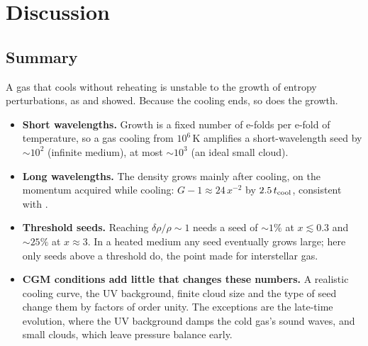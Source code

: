 \documentclass[11pt]{article}
\newcommand{\tcool}{t_{\rm cool}}
\newcommand{\drho}{\delta\rho/\rho}
\begin{document}
\section{Discussion}
\label{sec:discussion}

\subsection{Summary}
A gas that cools without reheating is unstable to the growth of entropy
perturbations, as \citet{field65} and \citet{schwarz72} showed. Because the cooling
ends, so does the growth.
\begin{itemize}
\item \textbf{Short wavelengths.} Growth is a fixed number of e-folds per e-fold of
  temperature, so a gas cooling from $10^6$\,K amplifies a short-wavelength seed by
  $\sim10^2$ (infinite medium), at most $\sim10^3$ (an ideal small cloud).
\item \textbf{Long wavelengths.} The density grows mainly after cooling, on the
  momentum acquired while cooling: $G-1\approx24\,x^{-2}$ by $2.5\,\tcool$, consistent
  with \citet{burkert00}.
\item \textbf{Threshold seeds.} Reaching $\drho\sim1$ needs a seed of $\sim1\%$ at
  $x\lesssim0.3$ and $\sim25\%$ at $x\approx3$. In a heated medium any seed eventually
  grows large; here only seeds above a threshold do, the point \citet{schwarz72}
  made for interstellar gas.
\item \textbf{CGM conditions add little that changes these numbers.} A realistic
  cooling curve, the UV background, finite cloud size and the type of seed change
  them by factors of order unity. The exceptions are the late-time evolution, where
  the UV background damps the cold gas's sound waves, and small clouds, which leave
  pressure balance early.
\end{itemize}
\end{document}
